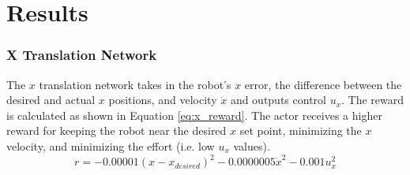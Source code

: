 \section{Results}
\subsubsection{X Translation Network}
The $x$ translation network takes in the robot's $x$ error, the difference between the desired and actual $x$ positions, and velocity $\dot{x}$ and outputs control $u_x$. The reward is calculated as shown in Equation \ref{eq:x_reward}. The actor receives a higher reward for keeping the robot near the desired $x$ set point, minimizing the $x$ velocity, and minimizing the effort (i.e. low $u_x$ values).
\begin{equation}
r = -0.00001(x-x_{desired})^2-0.0000005\dot{x}^2-0.001u_x^2
\label{eq:x_reward}
\end{equation}

